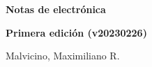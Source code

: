 \begin{center}
    \begin{Huge}
        \textbf{Notas de electrónica}
    \end{Huge}

    \vspace{1cm}
    \textbf{Primera edición (v20230226)}
    \vspace{2cm}

    \begin{Large}
        Malvicino, Maximiliano R.
    \end{Large}
\end{center}